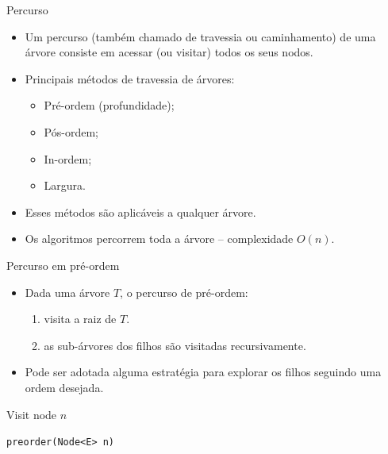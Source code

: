 \begin{frame}{Percurso}
	\begin{itemize}
		\item Um percurso (também chamado de travessia ou caminhamento) de uma árvore consiste em acessar (ou visitar) todos os seus nodos.
		\item Principais métodos de travessia de árvores:
		\begin{itemize}
			\item Pré-ordem (profundidade);
			\item Pós-ordem;
			\item In-ordem;
			\item Largura.
		\end{itemize}
		\item Esses métodos são aplicáveis a qualquer árvore.
		\item Os algoritmos percorrem toda a árvore -- complexidade $O(n)$.
	\end{itemize}
\end{frame}


\begin{frame}{Percurso em pré-ordem}
\begin{itemize}
	\item Dada uma árvore $T$, o percurso de pré-ordem:
	\begin{enumerate}
		\item visita a raiz de $T$.
		\item as sub-árvores dos filhos são visitadas recursivamente.
	\end{enumerate}
	\item Pode ser adotada alguma estratégia para explorar os filhos seguindo uma ordem desejada.
\end{itemize}

\bigskip
\bigskip

\begin{algorithm}[H]
	\DontPrintSemicolon
	Visit node $n$\;

	\caption{\texttt{preorder(Node<E> n)}}
\end{algorithm}

\end{frame}


